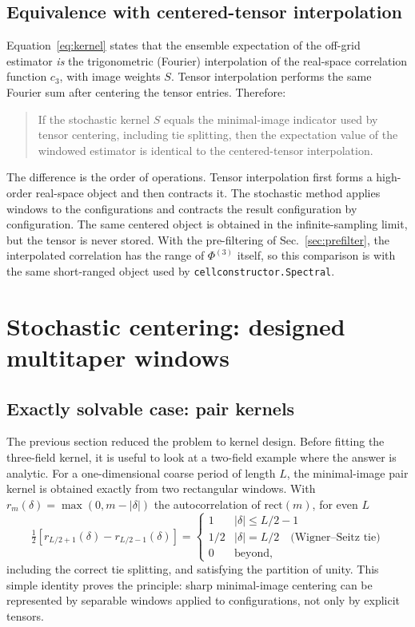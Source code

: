\documentclass[11pt,a4paper]{article}
\begin{document}
\subsection{Equivalence with centered-tensor interpolation}
\label{sec:equivalence}

Equation~\eqref{eq:kernel} states that the ensemble expectation of the
off-grid estimator \emph{is} the trigonometric (Fourier) interpolation of
the real-space correlation function $c_3$, with image weights $S$.  Tensor
interpolation performs the same Fourier sum after centering the tensor
entries.  Therefore:
\begin{quote}
If the stochastic kernel $S$ equals the minimal-image indicator used by
tensor centering, including tie splitting, then the expectation value of
the windowed estimator is identical to the centered-tensor interpolation.
\end{quote}
The difference is the order of operations.  Tensor interpolation first
forms a high-order real-space object and then contracts it.  The stochastic
method applies windows to the configurations and contracts the result
configuration by configuration.  The same centered object is obtained in
the infinite-sampling limit, but the tensor is never stored.  With the
pre-filtering of Sec.~\ref{sec:prefilter}, the interpolated correlation has
the range of $\Phi^{(3)}$ itself, so this comparison is with the same
short-ranged object used by \texttt{cellconstructor.Spectral}.

\section{Stochastic centering: designed multitaper windows}
\label{sec:windows}

\subsection{Exactly solvable case: pair kernels}

The previous section reduced the problem to kernel design.  Before fitting
the three-field kernel, it is useful to look at a two-field example where
the answer is analytic.  For a one-dimensional coarse period of length $L$,
the minimal-image pair kernel is obtained exactly from two rectangular
windows.  With
$r_m(\delta) = \max(0, m-|\delta|)$ the autocorrelation of
$\mathrm{rect}(m)$, for even $L$
\begin{equation}
\tfrac12\left[r_{L/2+1}(\delta) - r_{L/2-1}(\delta)\right] =
\begin{cases}
1 & |\delta| \le L/2-1\\
1/2 & |\delta| = L/2 \quad\text{(Wigner--Seitz tie)}\\
0 & \text{beyond},
\end{cases}
\end{equation}
including the correct tie splitting, and satisfying the partition of unity.
This simple identity proves the principle: sharp minimal-image centering can
be represented by separable windows applied to configurations, not only by
explicit tensors.
\end{document}
